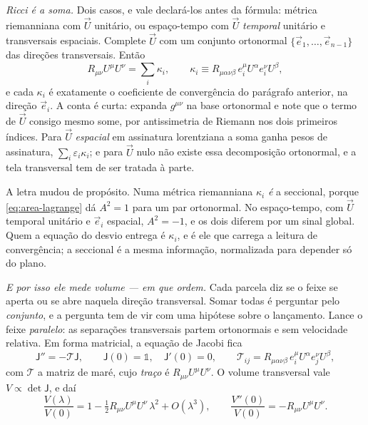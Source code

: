 \documentclass[12pt,a4paper,oneside]{book}
\theoremstyle{rgplain}
\theoremstyle{rgremark}
\begin{document}
\emph{Ricci é a soma.} Dois casos, e vale declará-los antes da fórmula:
métrica riemanniana com $\vec U$ unitário, ou espaço-tempo com $\vec U$
\emph{temporal} unitário e transversais espaciais. Complete $\vec U$ com um
conjunto ortonormal $\{\vec e_1,\dots,\vec e_{n-1}\}$ das direções
transversais. Então
\begin{equation}
  R_{\mu\nu}U^\mu U^\nu
  =\sum_{i}\kappa_i ,
  \qquad
  \kappa_i\equiv R_{\mu\alpha\nu\beta}\,
  e_i^\mu U^\alpha e_i^\nu U^\beta ,
  \label{eq:ricci-soma-seccionais}
\end{equation}
e cada $\kappa_i$ é exatamente o coeficiente de convergência do parágrafo
anterior, na direção $\vec e_i$. A conta é curta: expanda $g^{\mu\nu}$ na
base ortonormal e note que o termo de $\vec U$ consigo mesmo some, por
antissimetria de Riemann nos dois primeiros índices. Para $\vec U$
\emph{espacial} em assinatura lorentziana a soma ganha pesos de assinatura,
$\sum_i\varepsilon_i\kappa_i$; e para $\vec U$ nulo não existe essa
decomposição ortonormal, e a tela transversal tem de ser tratada à parte.

A letra mudou de propósito. Numa métrica riemanniana $\kappa_i$ \emph{é} a
seccional, porque \eqref{eq:area-lagrange} dá $A^2=1$ para um par
ortonormal. No espaço-tempo, com $\vec U$ temporal unitário e $\vec e_i$
espacial, $A^2=-1$, e os dois diferem por um sinal global. Quem a equação do
desvio entrega é $\kappa_i$, e é ele que carrega a leitura de convergência;
a seccional é a mesma informação, normalizada para depender só do plano.

\emph{E por isso ele mede volume --- em que ordem.} Cada parcela diz se o
feixe se aperta ou se abre naquela direção transversal. Somar todas é
perguntar pelo \emph{conjunto}, e a pergunta tem de vir com uma hipótese
sobre o lançamento. Lance o feixe \emph{paralelo}: as separações
transversais partem ortonormais e sem velocidade relativa. Em forma
matricial, a equação de Jacobi fica
\begin{equation}
  \mathsf J''=-\mathcal T\mathsf J ,
  \qquad \mathsf J(0)=\mathbb 1 , \quad \mathsf J'(0)=0 ,
  \qquad \mathcal T_{ij}=R_{\mu\alpha\nu\beta}\,
  e_i^\mu U^\alpha e_j^\nu U^\beta ,
  \label{eq:jacobi-matricial}
\end{equation}
com $\mathcal T$ a matriz de maré, cujo \emph{traço} é
$R_{\mu\nu}U^\mu U^\nu$. O volume transversal vale
$V\propto\det\mathsf J$, e daí
\begin{equation}
  \frac{V(\lambda)}{V(0)}
  =1-\tfrac12 R_{\mu\nu}U^\mu U^\nu\,\lambda^2+O(\lambda^3) ,
  \qquad
  \frac{V''(0)}{V(0)}=-R_{\mu\nu}U^\mu U^\nu .
  \label{eq:ricci-volume}
\end{equation}
\end{document}
